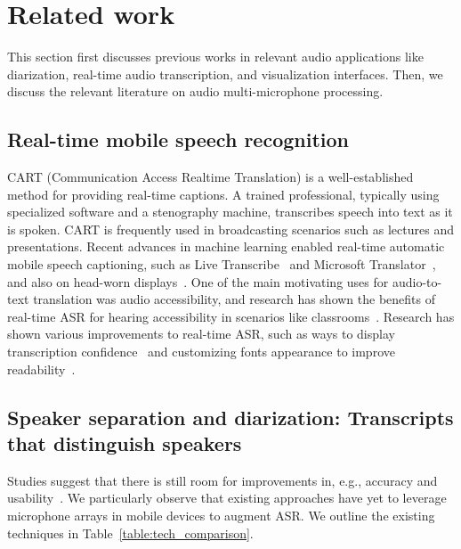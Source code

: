 \section{Related work}
This section first discusses previous works in relevant audio applications like diarization, real-time audio transcription, and visualization interfaces. Then, we discuss the relevant literature on audio multi-microphone processing.

\subsection{Real-time mobile speech recognition}
CART (Communication Access Realtime Translation) is a well-established method for providing real-time captions.  A trained professional, typically using specialized software and a stenography machine, transcribes speech into text as it is spoken. CART is frequently used in broadcasting scenarios such as lectures and presentations. Recent advances in machine learning enabled real-time automatic mobile speech captioning, such as Live Transcribe~\cite{LiveTranscribe} and Microsoft Translator~\cite{TranslatorMicrosoft}, and also on head-worn displays~\cite{wearable_subtitle}. One of the main motivating uses for audio-to-text translation was audio accessibility, and research has shown the benefits of real-time ASR for hearing accessibility in scenarios like classrooms~\cite{asr_deaf_classroom, tracked_asr_study}. Research has shown various improvements to real-time ASR, such as ways to display transcription confidence~\cite{perspective_on_imperfect_captions} and customizing fonts appearance to improve readability~\cite{preffered_captions_appearance}.

\subsection{Speaker separation and diarization: Transcripts that distinguish speakers} 

Studies suggest that there is still room for improvements in, e.g., accuracy and usability~\cite{asr_challanges_deaf}. We particularly observe that existing approaches have yet to leverage microphone arrays in mobile devices to augment ASR. We outline the existing techniques in Table~\ref{table:tech_comparison}.

